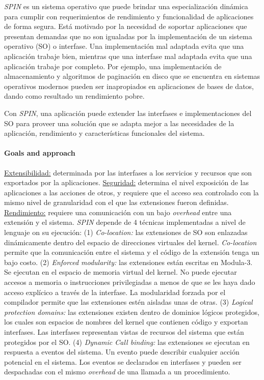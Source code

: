 \textit{SPIN} es un sistema operativo que puede brindar una especialización dinámica para cumplir con requerimientos de rendimiento y funcionalidad de aplicaciones de forma segura. Está motivado por la necesidad de soportar aplicaciones que presentan demandas que no son igualadas por la implementación de un sistema operativo (SO) o interfase. Una implementación mal adaptada evita que una aplicación trabaje bien, mientras que una interfase mal adaptada evita que una aplicación trabaje por completo. Por ejemplo, una implementación de almacenamiento y algoritmos de paginación en disco que se encuentra en sistemas operativos modernos pueden ser inapropiados en aplicaciones de bases de datos, dando como resultado un rendimiento pobre.

Con \textit{SPIN}, una aplicación puede extender las interfases e implementaciones del SO para proveer una solución que se adapta mejor a las necesidades de la aplicación, rendimiento y características funcionales del sistema.

\paragraph{\textnormal{\textbf{Goals and approach}}}
\underline{Extensibilidad:} determinada por las interfases a los servicios y recursos que son exportados por la aplicaciones. \underline{Seguridad:} determina el nivel exposición de las aplicaciones a las acciones de otros, y requiere que el acceso sea controlado con la mismo nivel de granularidad con el que las extensiones fueron definidas. \underline{Rendimiento:} requiere una comunicación con un bajo \textit{overhead} entre una extensión y el sistema. \textit{SPIN} depende de 4 técnicas implementadas a nivel de lenguaje on su ejecución: (1) \textit{Co-location:} las extensiones de SO son enlazadas dinámicamente dentro del espacio de direcciones virtuales del kernel. \textit{Co-location} permite que la comunicación entre el sistema y el código de la extensión tenga un bajo costo. (2) \textit{Enforced modularity:} las extensiones están escritas en Modula-3. Se ejecutan en el espacio de memoria virtual del kernel. No puede ejecutar accesos a memoria o instrucciones privilegiadas a menos de que se les haya dado acceso explícico a través de la interfase. La modularidad forzada por el compilador permite que las extensiones estén aisladas unas de otras. (3) \textit{Logical protection domains:} las extensiones existen dentro de dominios lógicos protegidos, los cuales son espacios de nombres del kernel que contienen código y exportan interfases. Las interfases representan vistas de recursos del sistema que están protegidos por el SO. (4) \textit{Dynamic Call binding:} las extensiones se ejecutan en respuesta a eventos del sistema. Un evento puede describir cualquier acción potencial en el sistema. Los eventos se declarados en interfases y pueden ser despachadas con el mismo \textit{overhead} de una llamada a un procedimiento.

